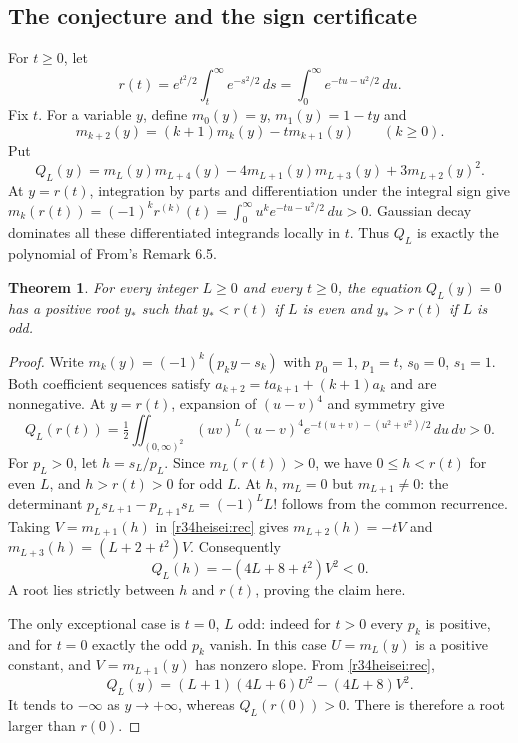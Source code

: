 \documentclass[11pt,a4paper]{article}
\numberwithin{equation}{section}
\newtheorem{theorem}{Theorem}[section]
\theoremstyle{definition}
\theoremstyle{remark}
\begin{document}
\subsection{The conjecture and the sign certificate}
For $t\ge0$, let
\[
 r(t)=e^{t^2/2}\int_t^\infty e^{-s^2/2}\,ds
     =\int_0^\infty e^{-tu-u^2/2}\,du.
\]
Fix $t$. For a variable $y$, define $m_0(y)=y$, $m_1(y)=1-ty$ and
\begin{equation}
m_{k+2}(y)=(k+1)m_k(y)-t m_{k+1}(y)\qquad(k\ge0).
\label{r34heisei:rec}
\end{equation}
Put
\[
Q_L(y)=m_L(y)m_{L+4}(y)-4m_{L+1}(y)m_{L+3}(y)+3m_{L+2}(y)^2 .
\]
At $y=r(t)$, integration by parts and differentiation under the integral
sign give $m_k(r(t))=(-1)^kr^{(k)}(t)
=\int_0^\infty u^ke^{-tu-u^2/2}\,du>0$.
Gaussian decay dominates all these differentiated integrands locally in $t$.
Thus $Q_L$ is exactly the polynomial of From's Remark 6.5.
\begin{theorem}
For every integer $L\ge0$ and every $t\ge0$, the equation $Q_L(y)=0$
has a positive root $y_*$ such that $y_*<r(t)$ if $L$ is even and
$y_*>r(t)$ if $L$ is odd.
\end{theorem}
\begin{proof}
Write $m_k(y)=(-1)^k(p_k y-s_k)$ with $p_0=1$, $p_1=t$, $s_0=0$,
$s_1=1$. Both coefficient sequences satisfy
$a_{k+2}=t a_{k+1}+(k+1)a_k$ and are nonnegative. At $y=r(t)$, expansion
of $(u-v)^4$ and symmetry give
\[
 Q_L(r(t))=\tfrac12\iint_{(0,\infty)^2}
 (uv)^L(u-v)^4e^{-t(u+v)-(u^2+v^2)/2}\,du\,dv>0 .
\]
For $p_L>0$, let $h=s_L/p_L$. Since $m_L(r(t))>0$, we have
$0\le h<r(t)$ for even $L$, and $h>r(t)>0$ for odd $L$.
At $h$, $m_L=0$ but $m_{L+1}\ne0$: the determinant
$p_Ls_{L+1}-p_{L+1}s_L=(-1)^L L!$ follows from the common recurrence.
Taking $V=m_{L+1}(h)$ in \eqref{r34heisei:rec} gives
$m_{L+2}(h)=-tV$ and $m_{L+3}(h)=(L+2+t^2)V$. Consequently
\[
 Q_L(h)=-(4L+8+t^2)V^2<0 .
\]
A root lies strictly between $h$ and $r(t)$, proving the claim here.

The only exceptional case is $t=0$, $L$ odd: indeed for $t>0$ every
$p_k$ is positive, and for $t=0$ exactly the odd $p_k$ vanish. In this
case $U=m_L(y)$ is a positive constant, and $V=m_{L+1}(y)$ has nonzero
slope. From \eqref{r34heisei:rec},
\[
Q_L(y)=(L+1)(4L+6)U^2-(4L+8)V^2.
\]
It tends to $-\infty$ as $y\to+\infty$, whereas $Q_L(r(0))>0$.
There is therefore a root larger than $r(0)$.
\end{proof}
\end{document}
